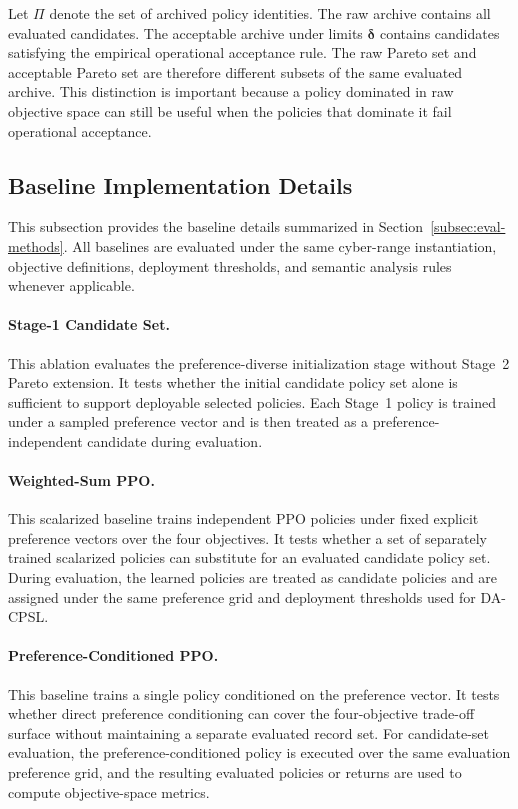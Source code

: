 \documentclass[sigconf,review,anonymous]{acmart}
\begin{document}
Let \(\Pi\) denote the set of archived policy identities. The raw archive
contains all evaluated candidates. The acceptable archive under limits
\(\boldsymbol{\delta}\) contains candidates satisfying the empirical
operational acceptance rule. The raw Pareto set and acceptable Pareto set
are therefore different subsets of the same evaluated archive. This
distinction is important because a policy dominated in raw objective
space can still be useful when the policies that dominate it fail
operational acceptance.

\subsection{Baseline Implementation Details}
\label{app:baseline-details}

This subsection provides the baseline details summarized in
Section~\ref{subsec:eval-methods}. All baselines are evaluated under the
same cyber-range instantiation, objective definitions, deployment
thresholds, and semantic analysis rules whenever applicable.

\paragraph{Stage-1 Candidate Set.}
This ablation evaluates the preference-diverse initialization stage
without Stage~2 Pareto extension. It tests whether the initial candidate
policy set alone is sufficient to support deployable selected policies.
Each Stage~1 policy is trained under a sampled preference vector and is
then treated as a preference-independent candidate during evaluation.

\paragraph{Weighted-Sum PPO.}
This scalarized baseline trains independent PPO policies under fixed
explicit preference vectors over the four objectives. It tests whether a
set of separately trained scalarized policies can substitute for an
evaluated candidate policy set. During evaluation, the learned policies
are treated as candidate policies and are assigned under the same
preference grid and deployment thresholds used for DA-CPSL.

\paragraph{Preference-Conditioned PPO.}
This baseline trains a single policy conditioned on the preference vector.
It tests whether direct preference conditioning can cover the
four-objective trade-off surface without maintaining a separate evaluated
record set. For candidate-set evaluation, the preference-conditioned
policy is executed over the same evaluation preference grid, and the
resulting evaluated policies or returns are used to compute
objective-space metrics.
\end{document}
